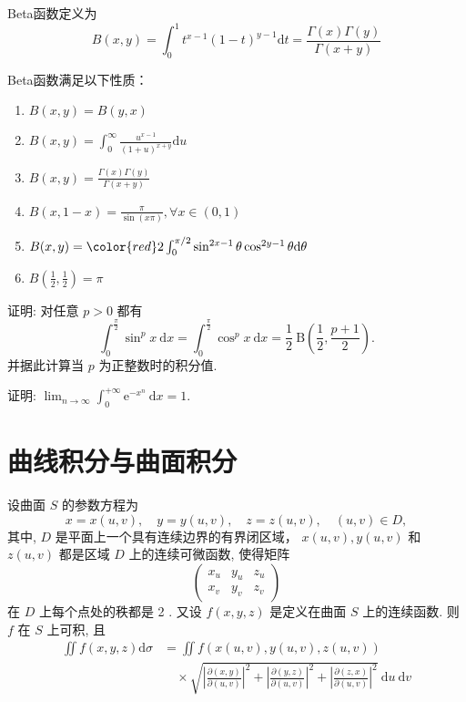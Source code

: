 \begin{definition}[Beta函数]
    Beta函数定义为
    $$
    B(x,y) = \int_0^1 t^{x-1}(1-t)^{y-1}\mathrm{d}t=\frac{\Gamma(x)\Gamma(y)}{\Gamma(x+y)}
    $$
\end{definition}

\begin{theorem}[Beta函数的性质]
    Beta函数满足以下性质：
    \begin{enumerate}
        \item $B(x,y) = B(y,x)$
        \item $B(x,y) = \int_0^\infty \frac{u^{x-1}}{(1+u)^{x+y}}\mathrm{d}u$
        \item $B(x,y) = \frac{\Gamma(x)\Gamma(y)}{\Gamma(x+y)}$
        \item $B(x,1-x) = \frac{\pi}{\sin(x\pi)},\forall x\in(0,1)$
        \item $B(x,y)={\color{red}2}\int_0^{\pi/2}\sin^{2x-1}\theta\cos^{2y-1}\theta\mathrm{d}\theta$
        \item $B\left(\frac{1}{2},\frac{1}{2}\right) = \pi$
    \end{enumerate}
\end{theorem}

\begin{exercise}
    证明: 对任意 $p>0$ 都有
$$
\int_0^{\frac{\pi}{2}} \sin ^p x \mathrm{~d} x=\int_0^{\frac{\pi}{2}} \cos ^p x \mathrm{~d} x=\frac{1}{2} \mathrm{~B}\left(\frac{1}{2}, \frac{p+1}{2}\right) .
$$
并据此计算当 $p$ 为正整数时的积分值.
\end{exercise}
\begin{exercise}
    证明: $\lim _{n \rightarrow \infty} \int_0^{+\infty} \mathrm{e}^{-x^n} \mathrm{~d} x=1$.
\end{exercise}

\section{曲线积分与曲面积分}

设曲面 $S$ 的参数方程为
$$
x=x(u, v), \quad y=y(u, v), \quad z=z(u, v), \quad(u, v) \in D,
$$
其中, $D$ 是平面上一个具有连续边界的有界闭区域， $x(u, v), y(u, v)$ 和 $z(u, v)$ 都是区域 $D$ 上的连续可微函数, 使得矩阵
$$
\left(\begin{array}{lll}
x_u & y_u & z_u \\
x_v & y_v & z_v
\end{array}\right)
$$
在 $D$ 上每个点处的秩都是 2 . 又设 $f(x, y, z)$ 是定义在曲面 $S$ 上的连续函数. 则 $f$ 在 $S$ 上可积, 且
\begin{align*}
\iint f(x, y, z) \mathrm{d} \sigma &= \iint f(x(u, v), y(u, v), z(u, v)) \\
&\quad \times \sqrt{\left|\frac{\partial(x, y)}{\partial(u, v)}\right|^2+\left|\frac{\partial(y, z)}{\partial(u, v)}\right|^2+\left|\frac{\partial(z, x)}{\partial(u, v)}\right|^2} \mathrm{~d} u \mathrm{~d} v
\end{align*}

